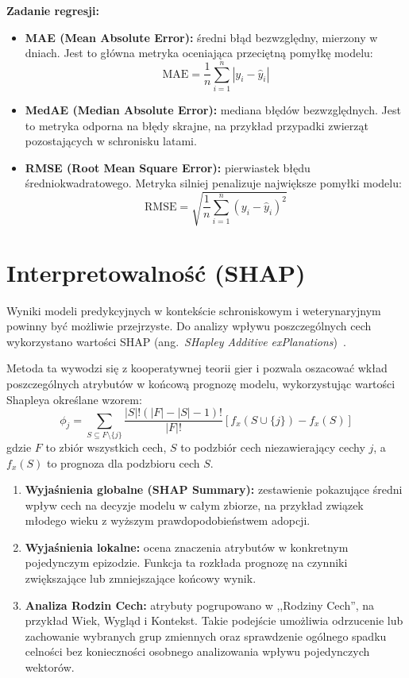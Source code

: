 \textbf{Zadanie regresji:}

\begin{itemize}\itemsep2pt
\item \textbf{MAE (Mean Absolute Error):} średni błąd bezwzględny, mierzony w dniach. Jest to główna metryka oceniająca przeciętną pomyłkę modelu:
\begin{equation}
\text{MAE} = \frac{1}{n} \sum_{i=1}^n |y_i - \hat{y}_i|
\end{equation}
\item \textbf{MedAE (Median Absolute Error):} mediana błędów bezwzględnych. Jest to metryka odporna na błędy skrajne, na przykład przypadki zwierząt pozostających w schronisku latami.
\item \textbf{RMSE (Root Mean Square Error):} pierwiastek błędu średniokwadratowego. Metryka silniej penalizuje największe pomyłki modelu:
\begin{equation}
\text{RMSE} = \sqrt{\frac{1}{n} \sum_{i=1}^n (y_i - \hat{y}_i)^2}
\end{equation}
\end{itemize}

\section{Interpretowalność (SHAP)}
\label{sec:interpretowalnosc-shap}

Wyniki modeli predykcyjnych w kontekście schroniskowym i weterynaryjnym powinny być możliwie przejrzyste. Do analizy wpływu poszczególnych cech wykorzystano wartości SHAP (ang.\ \emph{SHapley Additive exPlanations})~\cite{Lundberg2017}.

Metoda ta wywodzi się z kooperatywnej teorii gier i pozwala oszacować wkład poszczególnych atrybutów w końcową prognozę modelu, wykorzystując wartości Shapleya określane wzorem:
\begin{equation}
\phi_j = \sum_{S \subseteq F \setminus \{j\}} \frac{|S|! (|F| - |S| - 1)!}{|F|!} \left[ f_x(S \cup \{j\}) - f_x(S) \right]
\end{equation}
gdzie $F$ to zbiór wszystkich cech, $S$ to podzbiór cech niezawierający cechy $j$, a $f_x(S)$ to prognoza dla podzbioru cech $S$.

\begin{enumerate}\itemsep2pt
\item \textbf{Wyjaśnienia globalne (SHAP Summary):} zestawienie pokazujące średni wpływ cech na decyzje modelu w całym zbiorze, na przykład związek młodego wieku z wyższym prawdopodobieństwem adopcji.
\item \textbf{Wyjaśnienia lokalne:} ocena znaczenia atrybutów w konkretnym pojedynczym epizodzie. Funkcja ta rozkłada prognozę na czynniki zwiększające lub zmniejszające końcowy wynik.
\item \textbf{Analiza Rodzin Cech:} atrybuty pogrupowano w ,,Rodziny Cech'', na przykład Wiek, Wygląd i Kontekst. Takie podejście umożliwia odrzucenie lub zachowanie wybranych grup zmiennych oraz sprawdzenie ogólnego spadku celności bez konieczności osobnego analizowania wpływu pojedynczych wektorów.
\end{enumerate}

